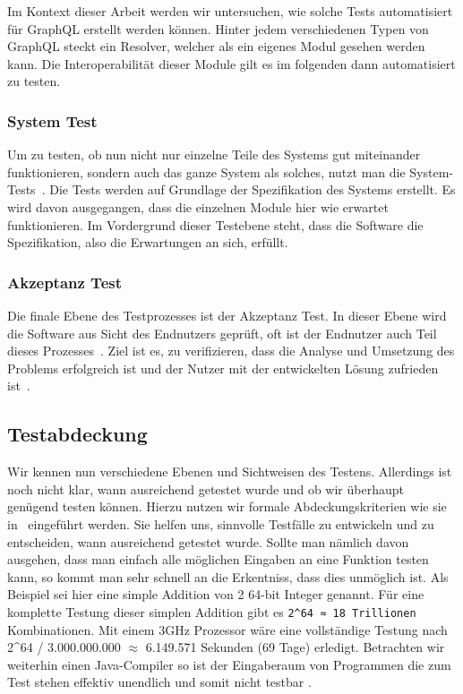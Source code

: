 Im Kontext dieser Arbeit werden wir untersuchen, wie solche Tests automatisiert für GraphQL erstellt werden können.
Hinter jedem verschiedenen Typen von GraphQL steckt ein Resolver, welcher als ein eigenes Modul gesehen werden kann.
Die Interoperabilität dieser Module gilt es im folgenden dann automatisiert zu testen.

\subsubsection{System Test}

Um zu testen, ob nun nicht nur einzelne Teile des Systems gut miteinander funktionieren, sondern auch das ganze System als
solches, nutzt man die System-Tests~\cite[vgl. S. 6]{software-testing}.
Die Tests werden auf Grundlage der Spezifikation des Systems erstellt.
Es wird davon ausgegangen, dass die einzelnen Module hier wie erwartet funktionieren.
Im Vordergrund dieser Testebene steht, dass die Software die Spezifikation, also die Erwartungen an sich, erfüllt.

\subsubsection{Akzeptanz Test}

Die finale Ebene des Testprozesses ist der Akzeptanz Test.
In dieser Ebene wird die Software aus Sicht des Endnutzers geprüft, oft ist der Endnutzer auch Teil dieses Prozesses~\cite[vgl. S.6]{software-testing}.
Ziel ist es, zu verifizieren, dass die Analyse und Umsetzung des Problems erfolgreich ist und der Nutzer mit der entwickelten Lösung
zufrieden ist~\cite[vgl. S.6]{software-testing}.

\subsection{Testabdeckung}
\label{abdeck}

Wir kennen nun verschiedene Ebenen und Sichtweisen des Testens.
Allerdings ist noch nicht klar, wann ausreichend getestet wurde und ob wir überhaupt genügend testen können.
Hierzu nutzen wir formale Abdeckungskriterien wie sie in~\cite{software-testing} eingeführt werden.
Sie helfen uns, sinnvolle Testfälle zu entwickeln und zu entscheiden, wann ausreichend getestet wurde.
Sollte man nämlich davon ausgehen, dass man einfach alle möglichen Eingaben an eine Funktion testen kann, so kommt
man sehr schnell an die Erkentniss, dass dies unmöglich ist.
Als Beispiel sei hier eine simple Addition von 2 64-bit Integer genannt.
Für eine komplette Testung dieser simplen Addition gibt es \verb+2^64 ≈ 18 Trillionen+ Kombinationen.
Mit einem 3GHz Prozessor wäre eine vollständige Testung nach \\ 2^{64} / 3.000.000.000 $ \approx $ 6.149.571 Sekunden (69 Tage) erledigt.
Betrachten wir weiterhin einen Java-Compiler so ist der Eingaberaum von Programmen die zum Test stehen effektiv unendlich und somit nicht testbar \cite[vgl. 1.3 Coverage Criteria for Testing]{software-testing}.

